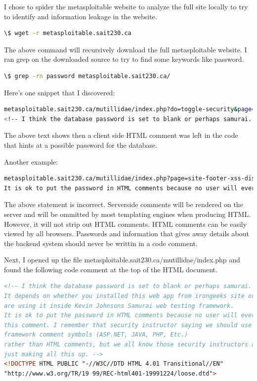 \documentclass{article}
\begin{document}
I chose to spider the metasploitable website to analyze the full site locally 
to try to identify and information leakage in the website.

\begin{lstlisting}[language=bash, firstline=1, lastline=1]
\$ wget -r metasploitable.sait230.ca
\end{lstlisting}

The above command will recursively download the full metasploitable website. I ran grep
on the downloaded source to try to find some keywords like password.

\begin{lstlisting}[language=bash]
\$ grep -rn password metasploitable.sait230.ca/
\end{lstlisting}

Here's one snippet that I discovered:

\begin{lstlisting}[language=bash]
metasploitable.sait230.ca/mutillidae/index.php?do=toggle-security&page=user-info.php:2: \
<!-- I think the database password is set to blank or perhaps samurai.
\end{lstlisting}

The above text shows then a client side HTML comment was left in the code that hints 
at a possible password for the database.

Another example:

\begin{lstlisting}[language=Bash]
metasploitable.sait230.ca/mutillidae/index.php?page=site-footer-xss-discussion.php:5: \
It is ok to put the password in HTML comments because no user will ever see 
\end{lstlisting}

The above statement is incorrect. Serverside comments will be rendered on the server
and will be ommitted by most templating engines when producing HTML\@. However, it will
not strip out HTML comments. HTML comments can be easily viewed by all browsers. Passwords
and information that gives away details about the backend system should never be
writtin in a code comment.

Next, I opened up the file metasploitable.sait230.ca/mutillidae/index.php and
found the following code comment at the top of the HTML document.

\begin{lstlisting}[language=HTML]
<!-- I think the database password is set to blank or perhaps samurai.
It depends on whether you installed this web app from irongeeks site or
are using it inside Kevin Johnsons Samurai web testing framework. 
It is ok to put the password in HTML comments because no user will ever see 
this comment. I remember that security instructor saying we should use the
framework comment symbols (ASP.NET, JAVA, PHP, Etc.) 
rather than HTML comments, but we all know those security instructors are 
just making all this up. -->
<!DOCTYPE HTML PUBLIC "-//W3C//DTD HTML 4.01 Transitional//EN" 
"http://www.w3.org/TR/19 99/REC-html401-19991224/loose.dtd">
\end{lstlisting}
\end{document}
